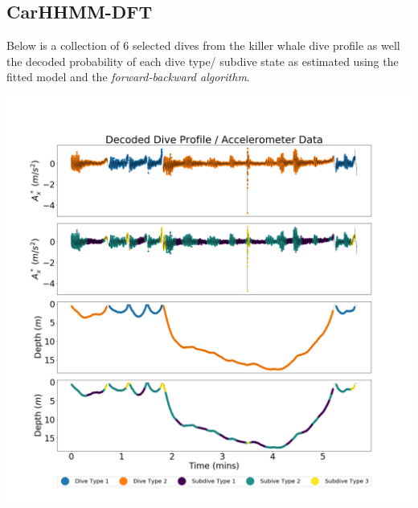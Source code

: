 \documentclass[12pt]{TD-CJS}
\begin{document}
\subsection{CarHHMM-DFT}

Below is a collection of 6 selected dives from the killer whale dive profile as well the decoded probability of each dive type/ subdive state as estimated using the fitted model and the \textit{forward-backward algorithm}.

\includegraphics[width=5.5in]{../Plots/CarHHMM2_decoded_dives.png}
\newpage
\end{document}
